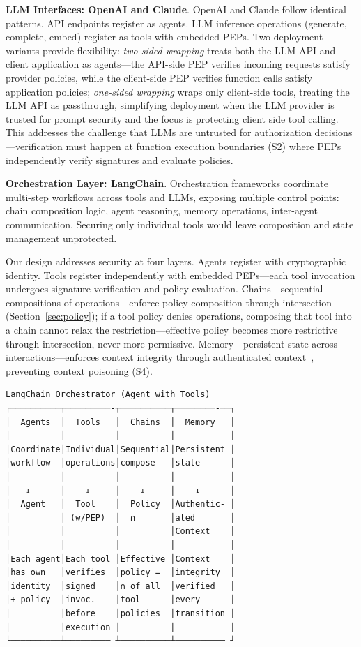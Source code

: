 \textbf{LLM Interfaces: OpenAI and Claude}. OpenAI and Claude follow identical patterns. API endpoints register as agents. LLM inference operations (generate, complete, embed) register as tools with embedded PEPs. Two deployment variants provide flexibility: \textit{two-sided wrapping} treats both the LLM API and client application as agents—the API-side PEP verifies incoming requests satisfy provider policies, while the client-side PEP verifies function calls satisfy application policies; \textit{one-sided wrapping} wraps only client-side tools, treating the LLM API as passthrough, simplifying deployment when the LLM provider is trusted for prompt security and the focus is protecting client side tool calling. This addresses the challenge that LLMs are untrusted for authorization decisions—verification must happen at function execution boundaries (S2) where PEPs independently verify signatures and evaluate policies.

\textbf{Orchestration Layer: LangChain}. Orchestration frameworks coordinate multi-step workflows across tools and LLMs, exposing multiple control points: chain composition logic, agent reasoning, memory operations, inter-agent communication. Securing only individual tools would leave composition and state management unprotected.

Our design addresses security at four layers. Agents register with cryptographic identity. Tools register independently with embedded PEPs—each tool invocation undergoes signature verification and policy evaluation. Chains—sequential compositions of operations—enforce policy composition through intersection (Section~\ref{sec:policy}); if a tool policy denies operations, composing that tool into a chain cannot relax the restriction—effective policy becomes more restrictive through intersection, never more permissive. Memory—persistent state across interactions—enforces context integrity through authenticated context~\cite{rajagopalan2025prompts}, preventing context poisoning (S4).

\noindent\begin{minipage}[t]{\columnwidth}
{\scriptsize
\begin{verbatim}
LangChain Orchestrator (Agent with Tools)
┌──────────┬─────────-┬──────────┬────────-──┐
│  Agents  │  Tools   │  Chains  │  Memory   │
│          │          │          │           │
│Coordinate│Individual│Sequential│Persistent │
│workflow  │operations│compose   │state      │
│          │          │          │           │
│   ↓      │    ↓     │    ↓     │    ↓      │
│  Agent   │  Tool    │  Policy  │Authentic- │
│          │ (w/PEP)  │  ∩       │ated       │
│          │          │          │Context    │
│          │          │          │           │
│Each agent│Each tool │Effective │Context    │
│has own   │verifies  │policy =  │integrity  │
│identity  │signed    │∩ of all  │verified   │
│+ policy  │invoc.    │tool      │every      │
│          │before    │policies  │transition │
│          │execution │          │           │
└──────────┴─────────-┴──────────┴──────────-┘
\end{verbatim}}
\end{minipage}


